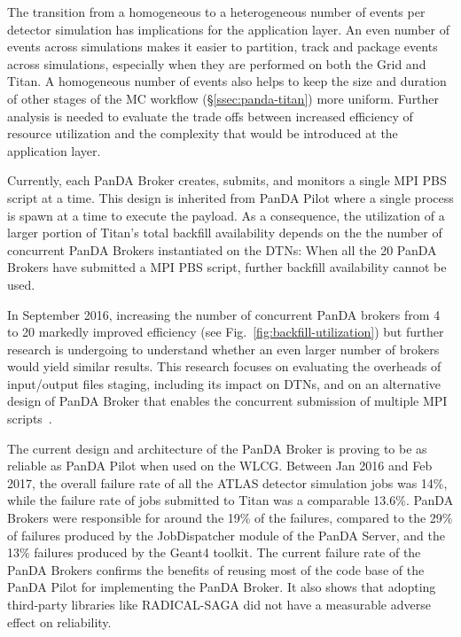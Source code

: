 The transition from a homogeneous to a heterogeneous number of events per
detector simulation has implications for the application layer. An even
number of events across simulations makes it easier to partition, track and
package events across simulations, especially when they are performed on both
the Grid and Titan. A homogeneous number of events also helps to keep the
size and duration of other stages of the MC workflow
(\S\ref{ssec:panda-titan}) more uniform. Further analysis is needed to
evaluate the trade offs between increased efficiency of resource utilization
and the complexity that would be introduced at the application layer.

Currently, each PanDA Broker creates, submits, and monitors a single MPI PBS
script at a time. This design is inherited from PanDA Pilot where a single
process is spawn at a time to execute the payload. As a consequence, the
utilization of a larger portion of Titan's total backfill availability
depends on the the number of concurrent PanDA Brokers instantiated on the
DTNs: When all the 20 PanDA Brokers have submitted a MPI PBS script, further
backfill availability cannot be used.

In September 2016, increasing the number of concurrent PanDA brokers from 4
to 20 markedly improved efficiency (see Fig.~\ref{fig:backfill-utilization})
but further research is undergoing to understand whether an even larger
number of brokers would yield similar results. This research focuses on
evaluating the overheads of input/output files staging, including its impact
on DTNs, and on an alternative design of PanDA Broker that enables the
concurrent submission of multiple MPI scripts~\cite{barreiro2016panda}.

The current design and architecture of the PanDA Broker is proving to be as
reliable as PanDA Pilot when used on the WLCG. Between Jan 2016 and Feb 2017,
the overall failure rate of all the ATLAS detector simulation jobs was 14\%,
while the failure rate of jobs submitted to Titan was a comparable 13.6\%.
PanDA Brokers were responsible for around the 19\% of the failures, compared
to the 29\% of failures produced by the JobDispatcher module of the PanDA
Server, and the 13\% failures produced by the Geant4 toolkit. The current
failure rate of the PanDA Brokers confirms the benefits of reusing most of
the code base of the PanDA Pilot for implementing the PanDA Broker. It also
shows that adopting third-party libraries like RADICAL-SAGA did not have a
measurable adverse effect on reliability.


